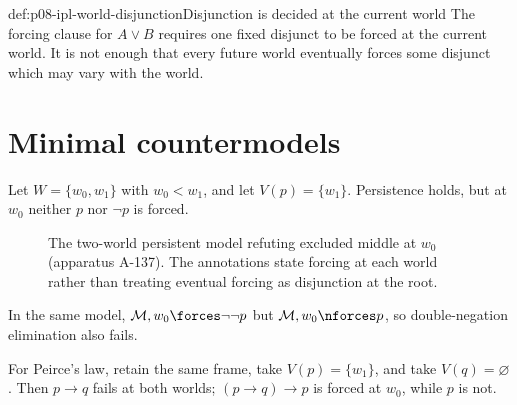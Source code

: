 \begin{hbwarning}{def:p08-ipl-world-disjunction}{Disjunction is decided at the current world}
The forcing clause for \(A\lor B\) requires one fixed disjunct to be forced at
the current world.  It is not enough that every future world eventually forces
some disjunct which may vary with the world.
\end{hbwarning}

\section{Minimal countermodels}

Let \(W=\{w_0,w_1\}\) with \(w_0<w_1\), and let
\(V(p)=\{w_1\}\).  Persistence holds, but at \(w_0\) neither \(p\) nor
\(\neg p\) is forced.

\begin{figure}[!htbp]
\centering
{}
\caption{The two-world persistent model refuting excluded middle at \(w_0\)
  (apparatus A-137).  The annotations state forcing at each world rather than
  treating eventual forcing as disjunction at the root.}
\label{fig:p08-ipl-excluded-middle}
\end{figure}

In the same model, \(\mathcal M,w_0\forces\neg\neg p\) but
\(\mathcal M,w_0\nforces p\), so
double-negation elimination also fails.

For Peirce's law, retain the same frame, take \(V(p)=\{w_1\}\), and take
\(V(q)=\varnothing\).  Then \(p\to q\) fails at both worlds;
\((p\to q)\to p\) is forced at \(w_0\), while \(p\) is not.

